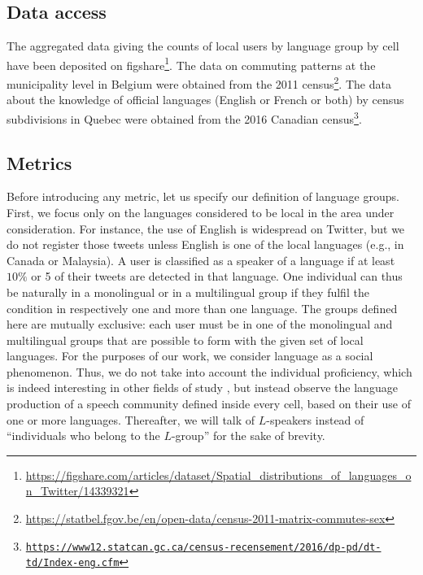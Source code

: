 \documentclass[../thesis.tex]{subfiles}
\begin{document}
\subsection{Data access}
The aggregated data giving the counts of local users by language group by cell have been
deposited on
figshare\footnote{\url{https://figshare.com/articles/dataset/Spatial_distributions_of_languages_on_Twitter/14339321}}.
The data on commuting patterns at the municipality level in Belgium were obtained from
the 2011
census\footnote{\url{https://statbel.fgov.be/en/open-data/census-2011-matrix-commutes-sex}}.
The data about the knowledge of official languages (English or French or both) by census
subdivisions in Quebec were obtained from the 2016 Canadian
census\footnote{\href{https://www12.statcan.gc.ca/census-recensement/2016/dp-pd/dt-td/Rp-eng.cfm?TABID=2&LANG=E&A=R&APATH=3&DETAIL=0&DIM=0&FL=A&FREE=0&GC=01&GL=-1&GID=1159582&GK=1&GRP=1&O=D&PID=110461&PRID=10&PTYPE=109445&S=0&SHOWALL=0&SUB=0&Temporal=2016&THEME=118&VID=0&VNAMEE=&VNAMEF=&D1=0&D2=0&D3=0&D4=0&D5=0&D6=0}{\texttt{https://www12.statcan.gc.ca/census-recensement/2016/dp-pd/dt-td/Index-eng.cfm}}}.



\subsection{Metrics}
Before introducing any metric, let us specify our definition of language groups. First,
we focus only on the languages considered to be local in the area under consideration.
For instance, the use of English is widespread on Twitter, but we do not register those
tweets unless English is one of the local languages (e.g., in Canada or Malaysia). A
user is classified as a speaker of a language if at least $10\%$ or 5 of their tweets
are detected in that language. One individual can thus be naturally in a monolingual or
in a multilingual group if they fulfil the condition in respectively one and more than one language. The
groups defined here are mutually exclusive: each user must be in one of the monolingual
and multilingual groups that are possible to form with the given set of local languages.
For the purposes of our work, we consider language as a social phenomenon. Thus, we do
not take into account the individual proficiency, which is indeed interesting in other
fields of study \cite{BakerFoundationsBilingual1997}, but instead observe the language
production of a speech community defined inside every cell, based on their use of one or
more languages. Thereafter, we will talk of $L$-speakers instead of ``individuals who
belong to the $L$-group'' for the sake of brevity.
\end{document}
